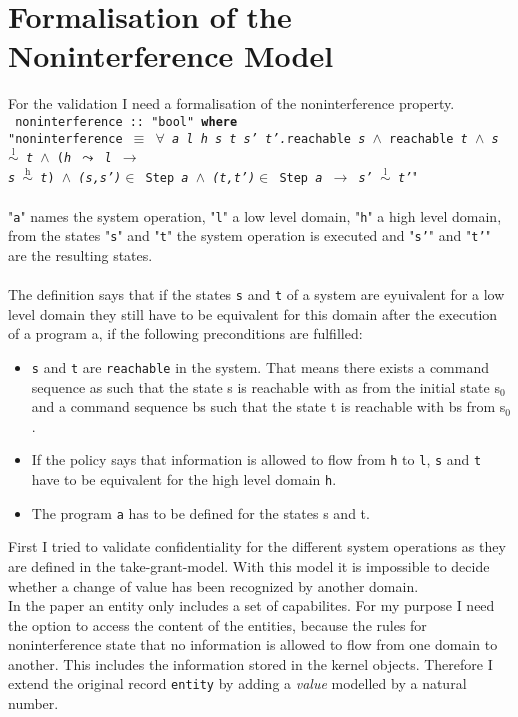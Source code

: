 \chapter{Formalisation of the Noninterference Model}\label{FormNon}
For the validation I need a formalisation of the noninterference property. \\ 

{
\texttt{
noninterference :: "bool" \textbf{where} \\
"noninterference $\equiv$ $\forall$ \textit{a l h s t s' t'.}reachable \textit{s} $\wedge$ reachable \textit{t} $\wedge$ \textit{s $\overset{\text{l}}{\sim}$ t} $\wedge$ (\textit{h $\leadsto$ l $\longrightarrow$ \\
 s $\overset{\text{h}}{\sim}$ t}) $\wedge$ \textit{(s,s')}$\in$ Step \textit{a} $\wedge$ \textit{(t,t')}$\in$ Step \textit{a} $\longrightarrow$ \textit{s' $\overset{\text{l}}{\sim}$ t'}}"} \\ \\

"\texttt{a}" names the system operation, "\texttt{l}" a low level domain, "\texttt{h}" a high level domain, from the states "\texttt{s}" and "\texttt{t}" the system operation is executed and "\texttt{s'}" and "\texttt{t'}" are the resulting states. \\ \\
The definition says that if the states \texttt{s} and \texttt{t} of a system are eyuivalent for a low level domain they still have to be equivalent for this domain after the execution of a program a, if the following preconditions are fulfilled: \\
\begin{itemize}
\item \texttt{s} and \texttt{t} are \texttt{reachable} in the system. That means there exists a command sequence as such that the state s is reachable with as from the initial state s$_0$ and a command sequence bs such that the state t is reachable with bs from s$_0$.
\item If the policy says that information is allowed to flow from \texttt{h} to \texttt{l}, \texttt{s} and \texttt{t} have to be equivalent for the high level domain \texttt{h}.
\item The program \texttt{a} has to be defined for the states s and t.
\end{itemize} 
First I tried to validate confidentiality for the different system operations as they are defined in the take-grant-model. With this model it is impossible to decide whether a change of value has been recognized by another domain. \\
In the paper an entity only includes a set of capabilites. For my purpose I need the option to access the content of the entities, because the rules for noninterference state that no information is allowed to flow from one domain to another. This includes the information stored in the kernel objects. 
Therefore I extend the original record \texttt{entity} by adding a \textit{value} modelled by a natural number. \\ 

